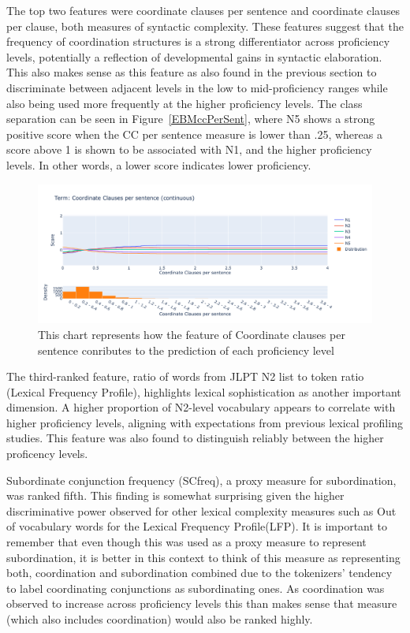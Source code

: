 The top two features were coordinate clauses per sentence and coordinate clauses per clause, both measures of
syntactic complexity. These features suggest that the frequency of coordination structures is a strong
differentiator across proficiency levels, potentially a reflection of developmental gains in syntactic elaboration. This
also makes sense as this feature as also found in the previous section to discriminate between adjacent levels in
the low to mid-proficiency ranges while also being used more frequently at the higher proficiency levels. The class
separation can be seen in Figure~\ref{EBMccPerSent}, where N5 shows a strong positive score when the CC per sentence
measure is lower than .25, whereas a score above 1 is shown to be associated with N1, and the higher proficiency
levels. In other words, a lower score indicates lower
proficiency.

\begin{figure}[h!]
    \centering
    \includegraphics[scale=.4]{img/EBM/EBMccPerSent}
    \caption[Contribution of Coordinate Clauses per Sentence]{This chart represents how the feature of Coordinate clauses per sentence conributes to the prediction of each proficiency level}
    \label{fig:EBMccPerSent}
\end{figure}


The third-ranked feature, ratio of words from JLPT N2 list to token ratio (Lexical Frequency Profile), highlights
lexical sophistication as another important dimension. A higher proportion of N2-level vocabulary appears to
correlate with higher proficiency levels, aligning with expectations from previous lexical profiling studies\citep{Laufer1995}. This feature was also found to distinguish reliably between the higher proficency levels.

Subordinate conjunction frequency (SCfreq), a proxy measure for subordination, was ranked fifth. This finding is
somewhat surprising given the higher discriminative power observed for other lexical complexity measures such as Out
of vocabulary words for the Lexical Frequency Profile(LFP). It is important to remember that even though this was
used as a proxy measure to represent subordination, it is better in this context to think of this measure as
representing both, coordination and subordination combined due to the tokenizers' tendency to label coordinating
conjunctions
as subordinating ones. As coordination was observed to increase across proficiency levels this than makes sense that
measure (which also includes coordination) would also be ranked highly.

